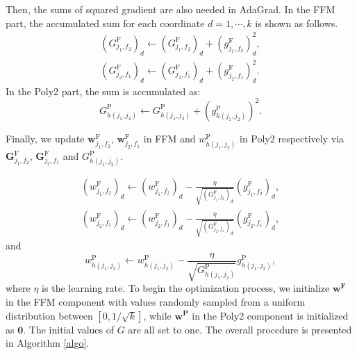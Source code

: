 Then, the sums of squared gradient are also needed in AdaGrad. In the FFM part, the accumulated sum for each coordinate $d=1,\cdots,k$ is shown as follows.
\begin{align}
\label{2.3}
(G_{j_1,f_2}^\text{F})_d\gets(G_{j_1,f_2}^\text{F})_d+(\mathit{g}_{j_1,f_2}^\text{F})_d^2, \\
\label{2.4}
(G_{j_2,f_1}^\text{F})_d\gets(G_{j_2,f_1}^\text{F})_d+(\mathit{g}_{j_2,f_1}^\text{F})_d^2.
\end{align}
In the Poly2 part, the sum is accumulated as:
\begin{equation}
\label{2.11}
G_{h(j_1,j_2)}^\text{P}\gets G_{h(j_1,j_2)}^\text{P} + (\mathit{g}_{h(j_1,j_2)}^\text{P})^2.
\end{equation}

Finally, we update $\boldsymbol{w}_{j_1,f_2}^\text{F}$, $\boldsymbol{w}_{j_2,f_1}^\text{F}$ in FFM and $w_{h(j_1,j_2)}^\text{P}$ in Poly2 respectively via $\boldsymbol{G}_{j_1,f_2}^\text{F}$, $\boldsymbol{G}_{j_2,f_1}^\text{F}$ and $G_{h(j_1,j_2)}^\text{P}$.

\begin{align}
(w_{j_1,f_2}^\text{F})_d\gets(w_{j_1,f_2}^\text{F})_d-\frac{\eta}{\sqrt{(G_{j_1,f_2}^\text{F})_d}}(\mathit{g}_{j_1,f_2}^\text{F})_d \label{2.7}, \\
(w_{j_2,f_1}^\text{F})_d\gets(w_{j_2,f_1}^\text{F})_d-\frac{\eta}{\sqrt{(G_{j_2,f_1}^\text{F})_d}}(\mathit{g}_{j_2,f_1}^\text{F})_d \label{2.8},
\end{align}
and
\begin{equation}
\label{2.10}
w_{h(j_1,j_2)}^\text{P}\gets w_{h(j_1,j_2)}^\text{P} - \frac{\eta}{\sqrt{G_{h(j_1,j_2)}^\text{P}}}\mathit{g}_{h(j_1,j_2)}^\text{P},
\end{equation}
where $\eta$ is the learning rate. To begin the optimization process, we initialize $\boldsymbol{w^\text{F}}$ in the FFM component with values randomly sampled from a uniform distribution between $[0,1/\sqrt{k}]$, while $\boldsymbol{w^\text{P}}$ in the Poly2 component is initialized as $\boldsymbol{0}$. The initial values of $G$ are all set to one. The overall procedure is presented in Algorithm \ref{algo}.

